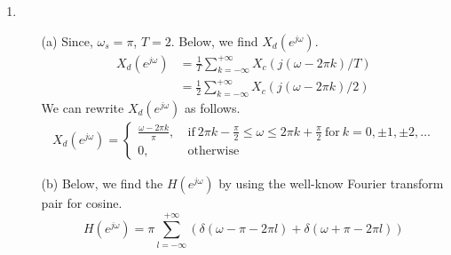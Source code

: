 \documentclass[10pt,a4paper, margin=1in]{article}
\begin{document}
\begin{enumerate}
\begin{itemize}
\begin{center}
		\end{center}
			
		\end{itemize}
		
	\item
	\begin{itemize}
		\item[(a)]
			Since, $\omega_s = \pi$, $T = 2$. Below, we find $X_d(e^{j\omega})$.
		\begin{equation}
		\begin{split}
			X_d(e^{j\omega}) & = \frac{1}{T} \sum_{k = -\infty}^{+\infty} X_c(j(\omega - 2\pi k)/T)\\
			& = \frac{1}{2} \sum_{k = -\infty}^{+\infty} X_c(j(\omega - 2\pi k)/2)
		\end{split}
		\end{equation}
		We can rewrite $X_d(e^{j\omega})$ as follows.
		\begin{equation}
		\begin{split}
			X_d(e^{j\omega}) = \begin{cases}
			\frac{\omega - 2\pi k}{\pi}, \ & \text{if} \ 2\pi k - \frac{\pi}{2} \leq \omega \leq 2\pi k + \frac{\pi}{2} \ \text{for} \ k = 0, \pm 1, \pm 2, \ldots\\
			0, \ & \text{otherwise}
						\end{cases}
		\end{split}
		\end{equation}
		
		\item[(b)]
			Below, we find the $H(e^{j\omega})$ by using the well-know Fourier transform pair for cosine.
		\begin{equation}
			H(e^{j\omega}) = \pi \sum_{l = -\infty}^{+\infty} \left( \delta(\omega - \pi - 2\pi l) + \delta(\omega + \pi - 2\pi l) \right)
		\end{equation}
		

\end{itemize}
\end{enumerate}
\end{document}
